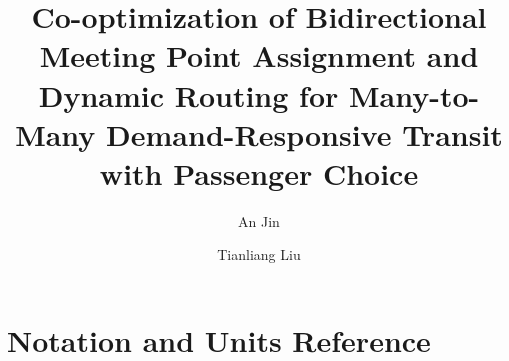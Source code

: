 \documentclass[review,12pt]{elsarticle}
\begin{document}
\begin{frontmatter}

\title{Co-optimization of Bidirectional Meeting Point Assignment and Dynamic Routing for Many-to-Many Demand-Responsive Transit with Passenger Choice}

\author[buaa]{An Jin}
\author[buaa]{Tianliang Liu}
\address[buaa]{School of Transportation Science and Engineering, Beihang University, Beijing 100191, China}



\end{frontmatter}












\appendix

\section{Notation and Units Reference}
\label{sec:appendix-notation}
\end{document}
